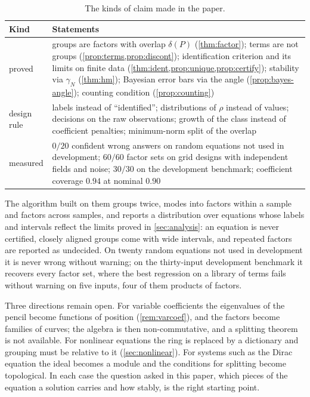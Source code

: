\documentclass[11pt]{article}
\theoremstyle{plain}
\theoremstyle{definition}
\theoremstyle{remark}
\newcommand{\gN}{\gamma_{N}}                %
\newcommand{\deltaP}{\delta(P)}             %
\begin{document}
\begin{table}[tbp]
\centering\small
\caption{The kinds of claim made in the paper.}\label{tab:status}
\begin{tabularx}{\linewidth}{@{}>{\raggedright\arraybackslash}p{2.2cm}X@{}}
\toprule
Kind & Statements\\
\midrule
proved & groups are factors with overlap $\deltaP$ (\cref{thm:factor}); terms are not groups (\cref{prop:terms,prop:discont});
identification criterion and its limits on finite data (\cref{thm:ident,prop:unique,prop:certify}); stability via
$\gN$ (\cref{thm:hm}); Bayesian error bars via the angle (\cref{prop:bayes-angle}); counting condition (\cref{prop:counting})\\
design rule & labels instead of ``identified''; distributions of $\rho$ instead of values; decisions on the raw observations;
growth of the class instead of coefficient penalties; minimum-norm split of the overlap\\
measured & $0/20$ confident wrong answers on random equations not used in development; $60/60$ factor sets on grid
designs with independent fields and noise; $30/30$ on the development benchmark; coefficient coverage $0.94$ at
nominal $0.90$\\
\bottomrule
\end{tabularx}
\end{table}



The algorithm built on them groups twice, modes into factors within a sample and factors across samples, and reports a
distribution over equations whose labels and intervals reflect the limits proved in \cref{sec:analysis}: an equation
is never certified, closely aligned groups come with wide intervals, and repeated factors are reported as undecided.
On twenty random equations not used in development it is never wrong without warning; on the thirty-input development
benchmark it recovers every factor set,
where the best regression on a library of terms fails without warning on five inputs, four of them products of
factors.

Three directions remain open. For variable coefficients the eigenvalues of the pencil become functions of position
(\cref{rem:varcoef}), and the factors become families of curves; the algebra is then non-commutative, and a splitting
theorem is not available. For nonlinear equations the ring is replaced by a dictionary and grouping must be relative
to it (\cref{sec:nonlinear}). For systems such as the Dirac equation the ideal becomes a module and the conditions for
splitting become topological. In each case the question asked in this paper, which pieces of the equation a solution
carries and how stably, is the right starting point.
\end{document}
